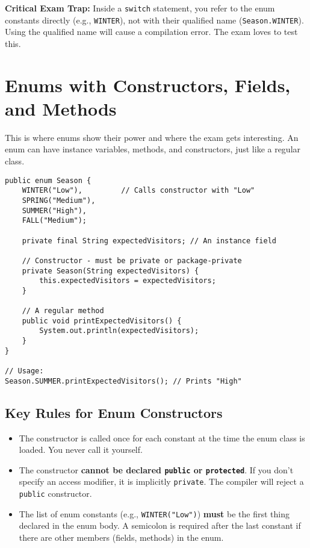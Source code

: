 \documentclass[12pt]{article}
\begin{document}
\begin{enumerate}[label=(\arabic*)]
\textbf{Critical Exam Trap:} Inside a \texttt{switch} statement, you refer to the enum constants directly (e.g., \texttt{WINTER}), not with their qualified name (\texttt{Season.WINTER}). Using the qualified name will cause a compilation error. The exam loves to test this.

\section{Enums with Constructors, Fields, and Methods}
This is where enums show their power and where the exam gets interesting. An enum can have instance variables, methods, and constructors, just like a regular class.

\begin{verbatim}
public enum Season {
    WINTER("Low"),         // Calls constructor with "Low"
    SPRING("Medium"),
    SUMMER("High"),
    FALL("Medium");

    private final String expectedVisitors; // An instance field

    // Constructor - must be private or package-private
    private Season(String expectedVisitors) {
        this.expectedVisitors = expectedVisitors;
    }

    // A regular method
    public void printExpectedVisitors() {
        System.out.println(expectedVisitors);
    }
}

// Usage:
Season.SUMMER.printExpectedVisitors(); // Prints "High"
\end{verbatim}

\subsection*{Key Rules for Enum Constructors}
\begin{itemize}
    \item The constructor is called once for each constant at the time the enum class is loaded. You never call it yourself.
    \item The constructor \textbf{cannot be declared \texttt{public} or \texttt{protected}}. If you don't specify an access modifier, it is implicitly \texttt{private}. The compiler will reject a \texttt{public} constructor.
    \item The list of enum constants (e.g., \texttt{WINTER("Low")}) \textbf{must} be the first thing declared in the enum body. A semicolon is required after the last constant if there are other members (fields, methods) in the enum.
\end{itemize}


\end{enumerate}
\end{document}
